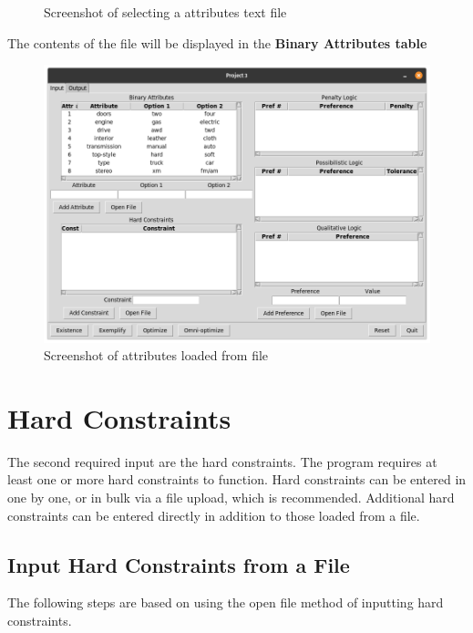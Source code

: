 \documentclass[12pt]{report}
\begin{document}
\begin{description}[leftmargin=4em]
\begin{figure}[H]
\begin{center}
\caption{Screenshot of selecting a attributes text file}
\end{center}
\end{figure}
\vspace{-2.5em}
\item [Result:] The contents of the file will be displayed in the \textbf{Binary Attributes table}
\begin{figure}[H]
\begin{center}
\includegraphics[scale=0.275,trim=1cm 1cm 1cm 1cm]{attributes_imported}
\caption{Screenshot of attributes loaded from file}
\end{center}
\end{figure}
\vspace{-2.5em}
\end{description}

\section{Hard Constraints}
The second required input are the hard constraints. The program requires at least one or more hard constraints to function. Hard constraints can be entered in one by one, or in bulk via a file upload, which is recommended. Additional hard constraints can be entered directly in addition to those loaded from a file.

\newpage
\subsection{Input Hard Constraints from a File}
The following steps are based on using the open file method of inputting hard constraints.\\
\end{document}
